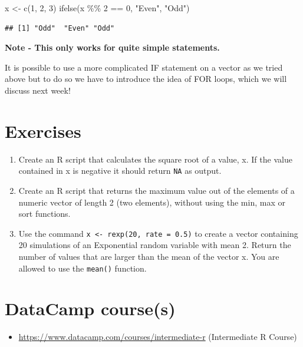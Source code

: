 \documentclass[
]{book}
\newenvironment{Shaded}{\begin{snugshade}}{\end{snugshade}}
\newcommand{\DecValTok}[1]{\textcolor[rgb]{0.00,0.00,0.81}{#1}}
\newcommand{\FunctionTok}[1]{\textcolor[rgb]{0.00,0.00,0.00}{#1}}
\newcommand{\NormalTok}[1]{#1}
\newcommand{\OtherTok}[1]{\textcolor[rgb]{0.56,0.35,0.01}{#1}}
\newcommand{\SpecialCharTok}[1]{\textcolor[rgb]{0.00,0.00,0.00}{#1}}
\newcommand{\StringTok}[1]{\textcolor[rgb]{0.31,0.60,0.02}{#1}}
\providecommand{\tightlist}{%
  \setlength{\itemsep}{0pt}\setlength{\parskip}{0pt}}
\theoremstyle{definition}
\theoremstyle{definition}
\theoremstyle{definition}
\theoremstyle{definition}
\theoremstyle{remark}
\begin{document}
\begin{Shaded}
\begin{Highlighting}[]
\NormalTok{x }\OtherTok{\textless{}{-}} \FunctionTok{c}\NormalTok{(}\DecValTok{1}\NormalTok{, }\DecValTok{2}\NormalTok{, }\DecValTok{3}\NormalTok{)}
\FunctionTok{ifelse}\NormalTok{(x }\SpecialCharTok{\%\%} \DecValTok{2} \SpecialCharTok{==} \DecValTok{0}\NormalTok{, }\StringTok{"Even"}\NormalTok{, }\StringTok{"Odd"}\NormalTok{)}
\end{Highlighting}
\end{Shaded}

\begin{verbatim}
## [1] "Odd"  "Even" "Odd"
\end{verbatim}

\textbf{Note - This only works for quite simple statements.}

It is possible to use a more complicated IF statement on a vector as we tried above but to do so we have to introduce the idea of FOR loops, which we will discuss next week!

\hypertarget{exercises-3}{%
\section{Exercises}\label{exercises-3}}

\begin{enumerate}
\def\labelenumi{\arabic{enumi}.}
\item
  Create an R script that calculates the square root of a value, x. If the value contained in x is negative it should return \texttt{NA} as output.
\item
  Create an R script that returns the maximum value out of the elements of a numeric vector of length 2 (two elements), without using the min, max or sort functions.
\item
  Use the command \texttt{x\ \textless{}-\ rexp(20,\ rate\ =\ 0.5)} to create a vector containing 20 simulations of an Exponential random variable with mean 2. Return the number of values that are larger than the mean of the vector x. You are allowed to use the \texttt{mean()} function.
\end{enumerate}

\hypertarget{datacamp-courses-1}{%
\section{DataCamp course(s)}\label{datacamp-courses-1}}

\begin{itemize}
\tightlist
\item
  \url{https://www.datacamp.com/courses/intermediate-r} (Intermediate R Course)
\end{itemize}
\end{document}
